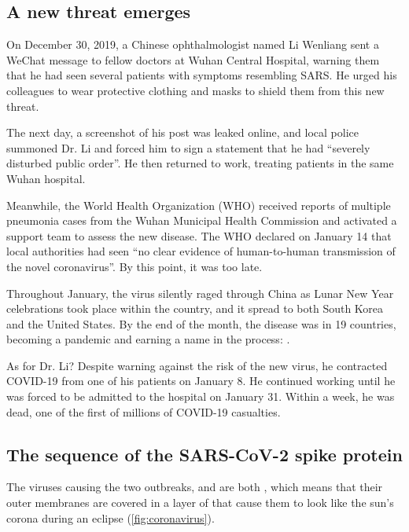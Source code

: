 \FloatBarrier
{}
\subsection{A new threat emerges}

On December 30, 2019, a Chinese ophthalmologist named Li Wenliang sent a WeChat message to fellow doctors at Wuhan Central Hospital, warning them that he had seen several patients with symptoms resembling SARS. He urged his colleagues to wear protective clothing and masks to shield them from this new threat.

The next day, a screenshot of his post was leaked online, and local police summoned Dr. Li and forced him to sign a statement that he had ``severely disturbed public order''. He then returned to work, treating patients in the same Wuhan hospital.

Meanwhile, the World Health Organization (WHO) received reports of multiple pneumonia cases from the Wuhan Municipal Health Commission and activated a support team to assess the new disease. The WHO declared on January 14 that local authorities had seen ``no clear evidence of human-to-human transmission of the novel coronavirus''. By this point, it was too late.

Throughout January, the virus silently raged through China as Lunar New Year celebrations took place within the country, and it spread to both South Korea and the United States. By the end of the month, the disease was in 19 countries, becoming a pandemic and earning a name in the process: .

As for Dr. Li? Despite warning against the risk of the new virus, he contracted COVID-19 from one of his patients on January 8. He continued working until he was forced to be admitted to the hospital on January 31. Within a week, he was dead, one of the first of millions of COVID-19 casualties.

\FloatBarrier
{}
\subsection{The sequence of the SARS-CoV-2 spike protein}

The viruses causing the two outbreaks,  and  are both , which means that their outer membranes are covered in a layer of  that cause them to look like the sun's corona during an eclipse (\autoref{fig:coronavirus}).\\

